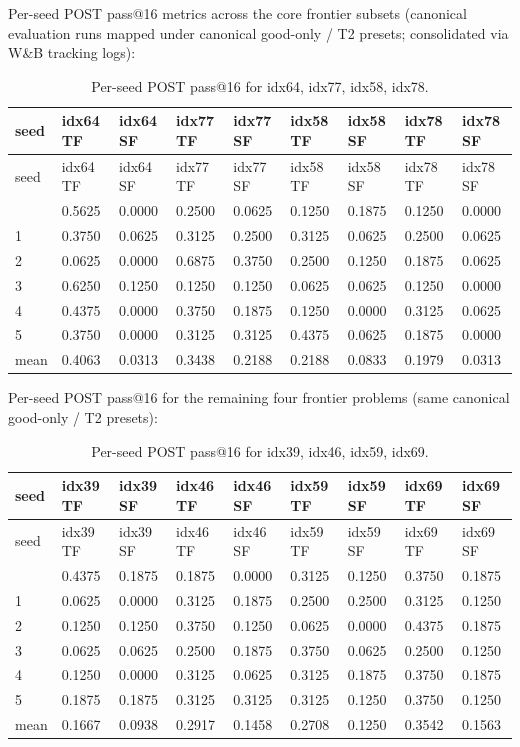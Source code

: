 \documentclass[12pt,a4paper]{report}
\begin{document}
Per-seed POST pass@16 metrics across the core frontier subsets (canonical evaluation runs mapped under canonical good-only / T2 presets; consolidated via W\&B tracking logs):

\begingroup\setlength{\tabcolsep}{3.5pt}
\begin{longtable}{lllllllll}
\caption{Per-seed POST pass@16 for idx64, idx77, idx58, idx78.}\\
\toprule
seed & idx64 TF & idx64 SF & idx77 TF & idx77 SF & idx58 TF & idx58 SF & idx78 TF & idx78 SF \\
\midrule
\endfirsthead
\toprule
seed & idx64 TF & idx64 SF & idx77 TF & idx77 SF & idx58 TF & idx58 SF & idx78 TF & idx78 SF \\
\midrule
\endhead
\bottomrule
\endfoot
0 & 0.5625 & 0.0000 & 0.2500 & 0.0625 & 0.1250 & 0.1875 & 0.1250 & 0.0000 \\
1 & 0.3750 & 0.0625 & 0.3125 & 0.2500 & 0.3125 & 0.0625 & 0.2500 & 0.0625 \\
2 & 0.0625 & 0.0000 & 0.6875 & 0.3750 & 0.2500 & 0.1250 & 0.1875 & 0.0625 \\
3 & 0.6250 & 0.1250 & 0.1250 & 0.1250 & 0.0625 & 0.0625 & 0.1250 & 0.0000 \\
4 & 0.4375 & 0.0000 & 0.3750 & 0.1875 & 0.1250 & 0.0000 & 0.3125 & 0.0625 \\
5 & 0.3750 & 0.0000 & 0.3125 & 0.3125 & 0.4375 & 0.0625 & 0.1875 & 0.0000 \\
mean & 0.4063 & 0.0313 & 0.3438 & 0.2188 & 0.2188 & 0.0833 & 0.1979 & 0.0313 \\
\end{longtable}\endgroup

Per-seed POST pass@16 for the remaining four frontier problems (same canonical good-only / T2 presets):

\begingroup\setlength{\tabcolsep}{3.5pt}
\begin{longtable}{lllllllll}
\caption{Per-seed POST pass@16 for idx39, idx46, idx59, idx69.}\\
\toprule
seed & idx39 TF & idx39 SF & idx46 TF & idx46 SF & idx59 TF & idx59 SF & idx69 TF & idx69 SF \\
\midrule
\endfirsthead
\toprule
seed & idx39 TF & idx39 SF & idx46 TF & idx46 SF & idx59 TF & idx59 SF & idx69 TF & idx69 SF \\
\midrule
\endhead
\bottomrule
\endfoot
0 & 0.4375 & 0.1875 & 0.1875 & 0.0000 & 0.3125 & 0.1250 & 0.3750 & 0.1875 \\
1 & 0.0625 & 0.0000 & 0.3125 & 0.1875 & 0.2500 & 0.2500 & 0.3125 & 0.1250 \\
2 & 0.1250 & 0.1250 & 0.3750 & 0.1250 & 0.0625 & 0.0000 & 0.4375 & 0.1875 \\
3 & 0.0625 & 0.0625 & 0.2500 & 0.1875 & 0.3750 & 0.0625 & 0.2500 & 0.1250 \\
4 & 0.1250 & 0.0000 & 0.3125 & 0.0625 & 0.3125 & 0.1875 & 0.3750 & 0.1875 \\
5 & 0.1875 & 0.1875 & 0.3125 & 0.3125 & 0.3125 & 0.1250 & 0.3750 & 0.1250 \\
mean & 0.1667 & 0.0938 & 0.2917 & 0.1458 & 0.2708 & 0.1250 & 0.3542 & 0.1563 \\
\end{longtable}\endgroup
\end{document}
